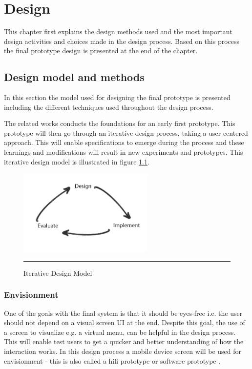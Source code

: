 \chapter{Design}
This chapter first explains the design methods used and the most important design activities and choices made in the design process. Based on this process the final prototype design is presented at the end of the chapter.

\section{Design model and methods}
In this section the model used for designing the final prototype is presented including the different techniques used throughout the design process.

The related works conducts the foundations for an early first prototype. This prototype will then go through an iterative design process, taking a user centered approach. This will enable specifications to emerge during the process and these learnings and modifications will result in new experiments and prototypes. This iterative design model is illustrated in figure \ref{fig:iterative}.

\begin{figure}[htbp]
	\centering
		\includegraphics[width=0.6\textwidth,height=\textheight,keepaspectratio]{./Figures/iterative.png}
		\rule{35em}{0.5pt}
	\caption[Iterative Design Model]{Iterative Design Model}
	\label{fig:iterative}
\end{figure}

\subsection{Envisionment}
One of the goals with the final system is that it should be eyes-free i.e. the user should not depend on a visual screen UI at the end. Despite this goal, the use of a screen to visualize e.g. a virtual menu, can be helpful in the design process. This will enable test users to get a quicker and better understanding of how the interaction works. In this design process a mobile device screen will be used for envisionment - this is also called a hifi prototype or software prototype \cite{benyon_designing_2010}.


